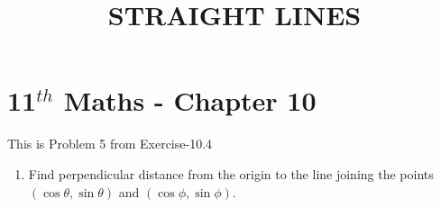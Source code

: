 \documentclass[10pt]{article}
\begin{document}
\begin{center}
\title{\textbf{STRAIGHT LINES}}
\date{\vspace{-5ex}} %
\maketitle
\end{center}

\section{11$^{th}$ Maths - Chapter 10}
This is Problem 5 from Exercise-10.4
\begin{enumerate}
\item Find perpendicular distance from the origin to the line joining the points$(\cos\theta,\sin\theta)$ and $(\cos\phi,\sin\phi)$.


\end{enumerate}
\end{document}
